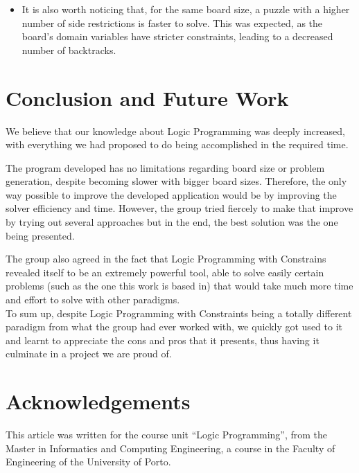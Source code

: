 \documentclass{llncs}
\begin{document}
\begin{itemize}
	\item It is also worth noticing that, for the same board size, a puzzle with a higher number of side restrictions is faster to solve. This was expected, as the board's domain variables have stricter constraints, leading to a decreased number of backtracks.
\end{itemize}

%
\section{Conclusion and Future Work}

We believe that our knowledge about Logic Programming was deeply increased, with everything we had proposed to do being accomplished in the required time.

The program developed has no limitations regarding board size or problem generation, despite becoming slower with bigger board sizes. Therefore, the only way possible to improve the developed application would be by improving the solver efficiency and time. However, the group tried fiercely to make that improve by trying out several approaches but in the end, the best solution was the one being presented.

The group also agreed in the fact that Logic Programming with Constrains revealed itself to be an extremely powerful tool, able to solve easily certain problems (such as the one this work is based in) that would take much more time and effort to solve with other paradigms.\\

To sum up, despite Logic Programming with Constraints being a totally different paradigm from what the group had ever worked with, we quickly got used to it and learnt to appreciate the cons and pros that it presents, thus having it culminate in a project we are proud of.

%
\section{Acknowledgements}
This article was written for the course unit ``Logic Programming'', from the Master in Informatics and Computing Engineering, a course in the Faculty of Engineering of the University of Porto.


%
%
\clearpage
{}
\renewcommand\refname{References}




\newpage
\appendix
\end{document}
